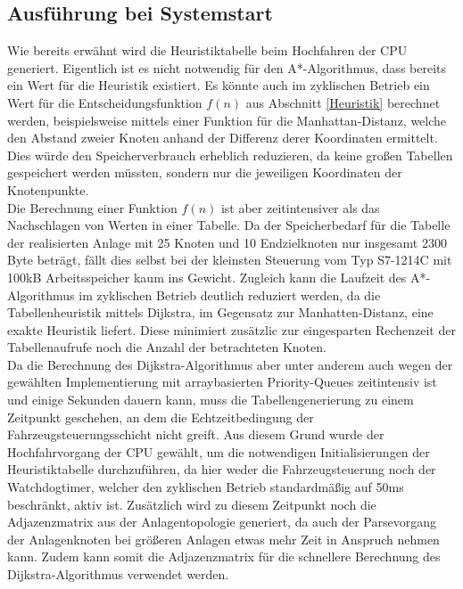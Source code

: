 	
		\subsection{Ausführung bei Systemstart}
			
			Wie bereits erwähnt wird die Heuristiktabelle beim Hochfahren der CPU generiert. Eigentlich ist es nicht notwendig für den A*-Algorithmus, dass bereits ein Wert für die Heuristik existiert. Es könnte auch im zyklischen Betrieb ein Wert für die Entscheidungsfunktion $f(n)$ aus Abschnitt \ref{Heuristik} berechnet werden, beispielsweise mittels einer Funktion für die Manhattan-Distanz, welche den Abstand zweier Knoten anhand der Differenz derer Koordinaten ermittelt. Dies würde den Speicherverbrauch erheblich reduzieren, da keine großen Tabellen gespeichert werden müssten, sondern nur die jeweiligen Koordinaten der Knotenpunkte.
			\\[4pt]
			Die Berechnung einer Funktion $f(n)$ ist aber zeitintensiver als das Nachschlagen von Werten in einer Tabelle. Da der Speicherbedarf für die Tabelle der realisierten Anlage mit 25 Knoten und 10 Endzielknoten nur insgesamt 2300 Byte beträgt, fällt dies selbst bei der kleinsten Steuerung vom Typ S7-1214C mit 100kB Arbeitsspeicher kaum ins Gewicht. Zugleich kann die Laufzeit des A*-Algorithmus im zyklischen Betrieb deutlich reduziert werden, da die Tabellenheuristik mittels Dijkstra, im Gegensatz zur Manhatten-Distanz, eine exakte Heuristik liefert. Diese minimiert zusätzlic zur eingesparten Rechenzeit der Tabellenaufrufe noch die Anzahl der betrachteten Knoten.
			\\[4pt]
			Da die Berechnung des Dijkstra-Algorithmus aber unter anderem auch wegen der gewählten Implementierung mit arraybasierten Priority-Queues zeitintensiv ist \cite{BorisCherkassky1993} und einige Sekunden dauern kann, muss die Tabellengenerierung zu einem Zeitpunkt geschehen, an dem die Echtzeitbedingung der Fahrzeugsteuerungsschicht nicht greift. Aus diesem Grund wurde der Hochfahrvorgang der CPU gewählt, um die notwendigen Initialisierungen der Heuristiktabelle durchzuführen, da hier weder die Fahrzeugsteuerung noch der Watchdogtimer, welcher den zyklischen Betrieb standardmäßig auf 50ms beschränkt, aktiv ist. Zusätzlich wird zu diesem Zeitpunkt noch die Adjazenzmatrix aus der Anlagentopologie generiert, da auch der Parsevorgang der Anlagenknoten bei größeren Anlagen etwas mehr Zeit in Anspruch nehmen kann. Zudem kann somit die Adjazenzmatrix für die schnellere Berechnung des Dijkstra-Algorithmus verwendet werden.
				
